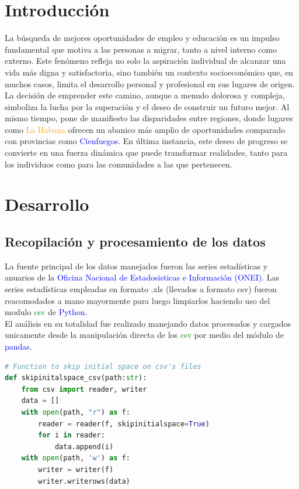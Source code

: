 \documentclass{article}
\begin{document}
\section{Introducción}
La búsqueda de mejores oportunidades de empleo y educación es un impulso fundamental que motiva a las personas a migrar, tanto a nivel interno como externo. Este fenómeno refleja no solo la aspiración individual de alcanzar una vida más digna y satisfactoria, sino también un contexto socioeconómico que, en muchos casos, limita el desarrollo personal y profesional en sus lugares de origen. La decisión de emprender este camino, aunque a menudo dolorosa y compleja, simboliza la lucha por la superación y el deseo de construir un futuro mejor. Al mismo tiempo, pone de manifiesto las disparidades entre regiones, donde lugares como \textcolor{orange}{La Habana} ofrecen un abanico más amplio de oportunidades comparado con provincias como \textcolor{blue}{Cienfuegos}. En última instancia, este deseo de progreso se convierte en una fuerza dinámica que puede transformar realidades, tanto para los individuos como para las comunidades a las que pertenecen.


\section{Desarrollo}
\subsection{Recopilación y procesamiento de los datos}
La fuente principal de los datos manejados fueron las series estadísticas y anuarios de la \textcolor{blue}{Oficina Nacional de Estadosisticas e Información (ONEI)}. Las series estadísticas empleadas en formato .xls (llevados a formato csv) fueron reacomodados a mano mayormente para luego limpiarlos haciendo uso del modulo \textcolor{green}{csv} de \textcolor{blue}{Python}.\\ 
El análisis en su totalidad fue realizado manejando datos procesados y cargados unicamente desde la manipulación directa de los \textcolor{green}{csv} por medio del módulo de \textcolor{blue}{pandas}.

\begin{lstlisting}[language=Python, caption=Funcion para la limpieza de los csv (eliminar espacios adicionales)]
# Function to skip initial space on csv's files
def skipinitalspace_csv(path:str):
    from csv import reader, writer
    data = []
    with open(path, "r") as f:
        reader = reader(f, skipinitialspace=True)
        for i in reader:
            data.append(i)
    with open(path, 'w') as f:
        writer = writer(f)
        writer.writerows(data)
\end{lstlisting}
\end{document}
